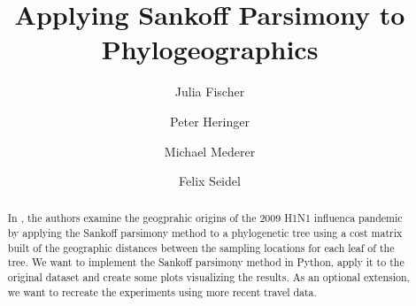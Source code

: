 \documentclass{article}
\title{Applying Sankoff Parsimony to Phylogeographics}
\author{Julia Fischer 
\and 
Peter Heringer
\and
Michael Mederer
\and
Felix Seidel}
\begin{document}
\maketitle
\begin{abstract}
In \cite{reimering2020phylogeographic}, the authors examine the geogprahic
origins of the 2009 H1N1 influenca pandemic by applying the Sankoff parsimony
method to a phylogenetic tree using a cost matrix built of the geographic
distances between the sampling locations for each leaf of the tree. 
We want to implement the Sankoff parsimony method in Python, apply it to the
original dataset \cite{reimering_distance_2019} and create some plots
visualizing the results. As an optional extension, we want to recreate the
experiments using more recent travel data.
\end{abstract}

\printbibliography
    
\end{document}
